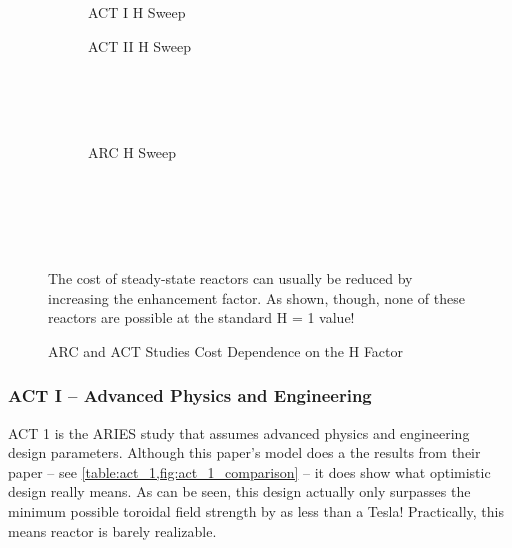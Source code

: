 \begin{figure*}[h!]
    \centering
    \hfill
    \begin{subfigure}[t]{0.425\textwidth}
        \centering
    \begin{adjustbox}{width=\textwidth}
      \Large
      
    \end{adjustbox}
        \caption{ACT I H Sweep}
    \end{subfigure}
    \hfill
    \begin{subfigure}[t]{0.425\textwidth}
        \centering
    \begin{adjustbox}{width=\textwidth}
      \Large
      
    \end{adjustbox}
        \caption{ACT II H Sweep}
    \end{subfigure}
    \hfill \hfill ~\\ ~\\ ~\\
    \begin{subfigure}[t]{0.425\textwidth}
        \centering
		\begin{adjustbox}{width=\textwidth}
			\Large
			
		\end{adjustbox}
        \caption{ARC H Sweep}
    \end{subfigure} ~\\ ~\\ ~\\
    \caption{ARC and ACT Studies Cost Dependence on the H Factor} ~\\
    \small The cost of steady-state reactors can usually be reduced by increasing the enhancement factor. As shown, though, none of these reactors are possible at the standard H = 1 value!
	\label{fig:act_h_cost}
\end{figure*}

\subsubsection{ACT I -- Advanced Physics and Engineering}

ACT 1 is the ARIES study that assumes advanced physics and engineering design parameters. Although this paper's model does a  the results from their paper -- see \cref{table:act_1,fig:act_1_comparison} -- it does show what optimistic design really means. As can be seen, this design actually only surpasses the minimum possible toroidal field strength by as less than a Tesla! Practically, this means  reactor is barely realizable. 

